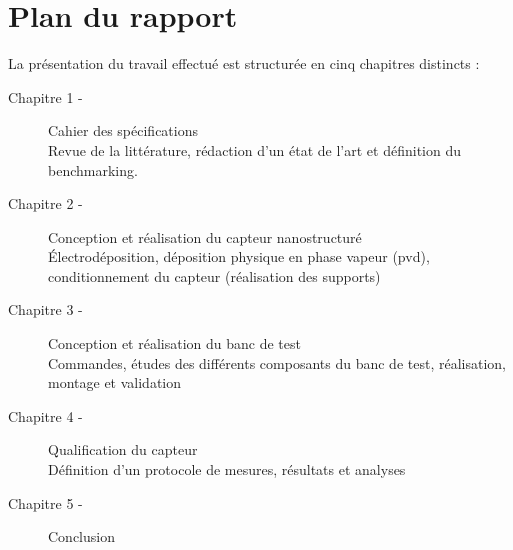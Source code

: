 \section{Plan du rapport}
La présentation du travail effectué est structurée en cinq chapitres distincts :
\begin{description}
    \item[Chapitre 1 -] Cahier des spécifications\\
        Revue de la littérature, rédaction d'un état de l'art et définition du benchmarking. \\
    \item[Chapitre 2 -] Conception et réalisation du capteur nanostructuré\\
        Électrodéposition, déposition physique en phase vapeur (\gls{pvd}), conditionnement du capteur (réalisation des supports)\\
    \item[Chapitre 3 -] Conception et réalisation du banc de test\\
        Commandes, études des différents composants du banc de test, réalisation, montage et validation\\
    \item[Chapitre 4 -] Qualification du capteur\\
        Définition d'un protocole de mesures, résultats et analyses\\
    \item[Chapitre 5 -] Conclusion\\
\end{description}

